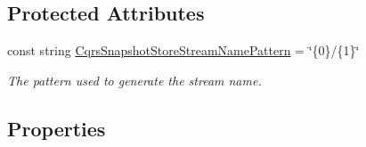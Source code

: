 \subsection*{Protected Attributes}
\begin{DoxyCompactItemize}
\item 
const string \hyperlink{classCqrs_1_1Snapshots_1_1SnapshotStore_a8113b186bf4a563b916d19c8d6d9cd0f_a8113b186bf4a563b916d19c8d6d9cd0f}{Cqrs\+Snapshot\+Store\+Stream\+Name\+Pattern} = \char`\"{}\{0\}/\{1\}\char`\"{}
\begin{DoxyCompactList}\small\item\em The pattern used to generate the stream name. \end{DoxyCompactList}\end{DoxyCompactItemize}
\subsection*{Properties}
